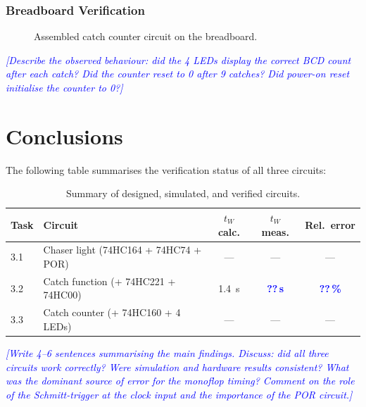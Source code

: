 \documentclass[12pt, a4paper]{article}
\newcommand{\val}[1]{\textcolor{blue}{\textbf{??\,\si{#1}}}}
\newcommand{\enter}[1]{\textcolor{blue}{\textit{[#1]}}}
\begin{document}
\subsubsection{Breadboard Verification}

\begin{figure}[H]
  \centering
  \caption{Assembled catch counter circuit on the breadboard.}
  \label{fig:board_counter}
\end{figure}

\enter{Describe the observed behaviour: did the 4 LEDs display the correct BCD count
after each catch? Did the counter reset to 0 after 9 catches? Did power-on reset
initialise the counter to 0?}

\section{Conclusions}

The following table summarises the verification status of all three circuits:

\begin{table}[H]
  \centering
  \caption{Summary of designed, simulated, and verified circuits.}
  \label{tab:summary}
  \begin{tabular}{llccc}
    \toprule
    Task & Circuit & $t_W$ calc. & $t_W$ meas. & Rel.\ error \\
    \midrule
    3.1 & Chaser light (74HC164 + 74HC74 + POR)    & ---              & ---          & --- \\
    3.2 & Catch function (+ 74HC221 + 74HC00)       & \SI{1.4}{\second}& \val{\second}& \val{\percent} \\
    3.3 & Catch counter (+ 74HC160 + 4 LEDs)        & ---              & ---          & --- \\
    \bottomrule
  \end{tabular}
\end{table}

\enter{Write 4--6 sentences summarising the main findings. Discuss: did all three
circuits work correctly? Were simulation and hardware results consistent? What was
the dominant source of error for the monoflop timing? Comment on the role of the
Schmitt-trigger at the clock input and the importance of the POR circuit.}
\end{document}
